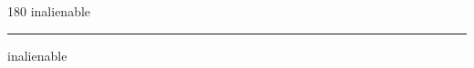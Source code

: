 
\begin{frame}
\begin{center}
\begin{turn}{180}
{\fontsize{2.5cm}{1em}\selectfont inalienable}
\end{turn}
\vspace{1em}\par  
\hrule
\vspace{1em}\par  
{\fontsize{2.5cm}{1em}\selectfont inalienable}
\end{center}
\end{frame}
